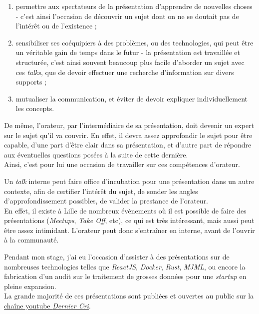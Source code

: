 \documentclass[12pt,a4paper]{article}
\providecommand{\tightlist}{%
  \setlength{\itemsep}{0pt}\setlength{\parskip}{0pt}}
\begin{document}
  \begin{enumerate}
  \def\labelenumi{\arabic{enumi}.}
  \tightlist
  \item
    permettre aux spectateurs de la présentation d'apprendre de nouvelles
    choses - c'est ainsi l'occasion de découvrir un sujet dont on ne se
    doutait pas de l'intérêt ou de l'existence ;\\
  \item
    sensibiliser ses coéquipiers à des problèmes, ou des technologies, qui
    peut être un véritable gain de temps dans le futur - la présentation
    est travaillée et structurée, c'est ainsi souvent beaucoup plus facile
    d'aborder un sujet avec ces \emph{talks}, que de devoir effectuer une
    recherche d'information sur divers supports ;\\
  \item
    mutualiser la communication, et éviter de devoir expliquer
    individuellement les concepts.
  \end{enumerate}

  \bigskip

  De même, l'orateur, par l'intermédiaire de sa présentation, doit devenir
  un expert sur le sujet qu'il va couvrir. En effet, il devra assez
  approfondir le sujet pour être capable, d'une part d'être clair dans sa
  présentation, et d'autre part de répondre aux éventuelles questions
  posées à la suite de cette dernière.\\
  Ainsi, c'est pour lui une occasion de travailler sur ces compétences
  d'orateur.

  \bigskip

  Un \emph{talk} interne peut faire office d'incubation pour une
  présentation dans un autre contexte, afin de certifier l'intérêt du
  sujet, de sonder les angles d'approfondissement possibles, de valider la
  prestance de l'orateur.\\
  En effet, il existe à Lille de nombreux évènements où il est possible de
  faire des présentations (\emph{Meetups}, \emph{Take Off}, etc), ce qui
  est très intéressant, mais aussi peut être assez intimidant. L'orateur
  peut donc s'entraîner en interne, avant de l'ouvrir à la communauté.

  \bigskip

  Pendant mon stage, j'ai eu l'occasion d'assister à des présentations sur
  de nombreuses technologies telles que \emph{ReactJS}, \emph{Docker},
  \emph{Rust}, \emph{MJML}, ou encore la fabrication d'un audit sur le
  traitement de grosses données pour une \emph{startup} en pleine
  expansion.\\
  La grande majorité de ces présentations sont publiées et ouvertes au
  public sur la
  \href{https://www.youtube.com/channel/UCDfdBlzldhg_PEu3xZTPsHg}{chaîne
  youtube \emph{Dernier Cri}}.
\end{document}
